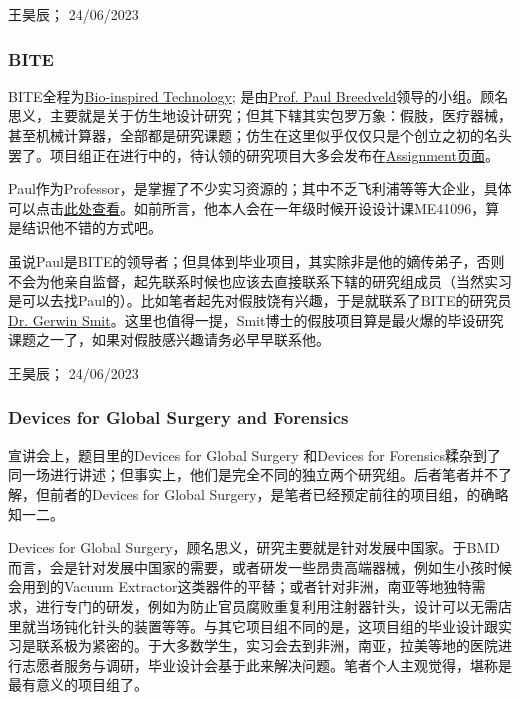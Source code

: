 \begin{flushright}
王昊辰； 24/06/2023
\end{flushright}

\subsubsection{BITE}
BITE全程为\href{https://www.bitegroup.nl/}{\uline{Bio-inspired Technology}}; 是由\href{https://www.linkedin.com/in/paul-breedveld-b0212b8a?originalSubdomain=nl}{\uline{Prof. Paul Breedveld}}领导的小组。顾名思义，主要就是关于仿生地设计研究；但其下辖其实包罗万象：假肢，医疗器械，甚至机械计算器，全部都是研究课题；仿生在这里似乎仅仅只是个创立之初的名头罢了。项目组正在进行中的，待认领的研究项目大多会发布在\href{https://www.bitegroup.nl/assignments/}{\uline{Assignment页面}}。 

Paul作为Professor，是掌握了不少实习资源的；其中不乏飞利浦等等大企业，具体可以点击\href{https://www.bitegroup.nl/internships/}{\uline{此处查看}}。如前所言，他本人会在一年级时候开设设计课ME41096，算是结识他不错的方式吧。

虽说Paul是BITE的领导者；但具体到毕业项目，其实除非是他的嫡传弟子，否则不会为他亲自监督，起先联系时候也应该去直接联系下辖的研究组成员（当然实习是可以去找Paul的）。比如笔者起先对假肢饶有兴趣，于是就联系了BITE的研究员\href{https://www.bitegroup.nl/people/gerwin-smit/}{Dr. Gerwin Smit}。这里也值得一提，Smit博士的假肢项目算是最火爆的毕设研究课题之一了，如果对假肢感兴趣请务必早早联系他。
\begin{flushright}
王昊辰； 24/06/2023
\end{flushright}

\subsubsection{Devices for Global Surgery and Forensics}
宣讲会上，题目里的Devices for Global Surgery 和Devices for Forensics糅杂到了同一场进行讲述；但事实上，他们是完全不同的独立两个研究组。后者笔者并不了解，但前者的Devices for Global Surgery，是笔者已经预定前往的项目组，的确略知一二。

Devices for Global Surgery，顾名思义，研究主要就是针对发展中国家。于BMD而言，会是针对发展中国家的需要，或者研发一些昂贵高端器械，例如生小孩时候会用到的Vacuum Extractor这类器件的平替；或者针对非洲，南亚等地独特需求，进行专门的研发，例如为防止官员腐败重复利用注射器针头，设计可以无需店里就当场钝化针头的装置等等。与其它项目组不同的是，这项目组的毕业设计跟实习是联系极为紧密的。于大多数学生，实习会去到非洲，南亚，拉美等地的医院进行志愿者服务与调研，毕业设计会基于此来解决问题。笔者个人主观觉得，堪称是最有意义的项目组了。

